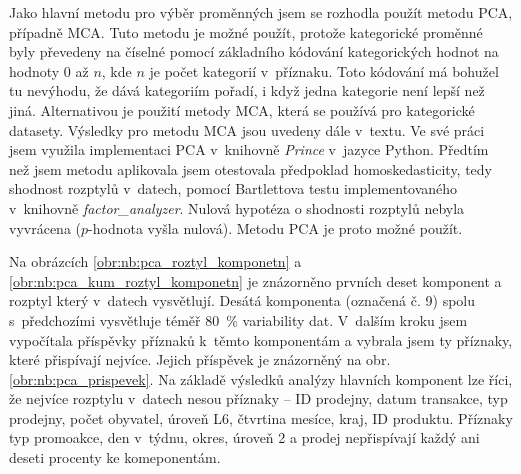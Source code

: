 Jako hlavní metodu pro výběr proměnných jsem se rozhodla použít metodu PCA, případně MCA. Tuto metodu je možné použít, protože kategorické proměnné byly převedeny na číselné pomocí základního kódování kategorických hodnot na hodnoty 0 až $n$, kde $n$ je počet kategorií v~příznaku. Toto kódování má bohužel tu nevýhodu, že dává kategoriím pořadí, i když jedna kategorie není lepší než jiná. Alternativou je použití metody MCA, která se používá pro kategorické datasety. Výsledky pro metodu MCA jsou uvedeny dále v~textu.
Ve své práci jsem využila implementaci PCA v~knihovně \emph{Prince} v~jazyce Python. 
Předtím než jsem metodu aplikovala jsem otestovala předpoklad homoskedasticity, tedy shodnost rozptylů v~datech, pomocí Bartlettova testu implementovaného v~knihovně \emph{factor\_analyzer}. Nulová hypotéza o shodnosti rozptylů nebyla vyvrácena ($p$-hodnota vyšla nulová). Metodu PCA je proto možné použít.

Na obrázcích \ref*{obr:nb:pca_roztyl_komponetn} a \ref*{obr:nb:pca_kum_roztyl_komponetn} je znázorněno prvních deset komponent a rozptyl který v~datech vysvětlují. 
Desátá komponenta (označená č. 9) spolu s~předchozími vysvětluje téměř 80~\% variability dat. V~dalším kroku jsem vypočítala příspěvky příznaků k~těmto komponentám a vybrala jsem ty příznaky, které přispívají nejvíce. Jejich příspěvek je znázorněný na obr. \ref*{obr:nb:pca_prispevek}. Na základě výsledků analýzy hlavních komponent lze říci, že nejvíce rozptylu v~datech nesou příznaky -- ID prodejny, datum transakce, typ prodejny, počet obyvatel, úroveň L6, čtvrtina mesíce, kraj, ID produktu. Příznaky typ promoakce, den v~týdnu, okres, úroveň 2 a prodej nepřispívají každý ani deseti procenty ke komeponentám.

